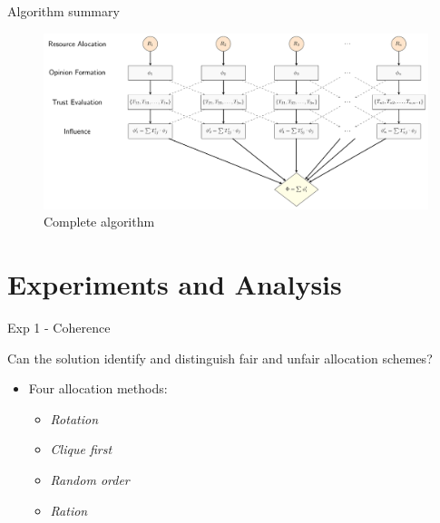 \begin{frame}{Algorithm summary}

\begin{figure}[htbp]
\centering
\includegraphics{pics/algdiagram.pdf}
\caption{Complete algorithm}
\end{figure}

\end{frame}

\section{Experiments and Analysis}\label{experiments-and-analysis}

\begin{frame}{Exp 1 - Coherence}

\begin{block}{}
Can the solution identify and distinguish fair and unfair allocation schemes?
\end{block}

\begin{itemize}
\tightlist
\item
  Four allocation methods:

  \begin{itemize}
  \tightlist
  \item
    \emph{Rotation}
  \item
    \emph{Clique first}
  \item
    \emph{Random order}
  \item
    \emph{Ration}
  \end{itemize}
\end{itemize}

\end{frame}

